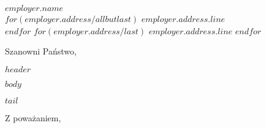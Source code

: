 \documentclass{letter}
\begin{document}
 
\begin{letter}{$employer.name$ \\ $for(employer.address/allbutlast)$ $employer.address.line$ \\ $endfor$ $for(employer.address/last)$ $employer.address.line$ $endfor$} 
\opening{Szanowni Państwo,} 

$header$

$body$

$tail$

\closing{Z poważaniem,\\
 \\
}
 
\end{letter} 
\end{document}
